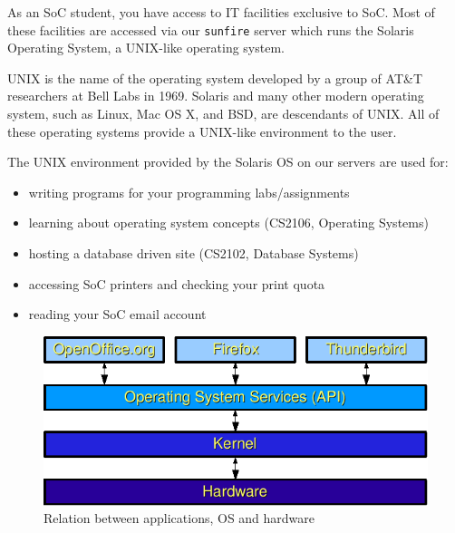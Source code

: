 
As an SoC student, you have access to IT facilities exclusive to SoC. Most of
these facilities are accessed via our \texttt{sunfire} server which runs the
Solaris Operating System, a UNIX-like operating system.  

UNIX is the name of the operating system developed by a group of AT\&T
researchers at Bell Labs in 1969.  Solaris and many other modern operating
system, such as Linux, Mac OS X, and BSD, are descendants of UNIX. All of these
operating systems provide a UNIX-like environment to the user. 

\begin{frame}
The UNIX environment provided by the Solaris OS on our servers are used for:
\begin{itemize}
\item writing programs for your programming labs/assignments
\item learning about operating system concepts (CS2106, Operating Systems)
\item hosting a database driven site (CS2102, Database Systems)
\item accessing SoC printers and checking your print quota
\item reading your SoC email account
\end{itemize}
\end{frame}

\begin{frame}
\begin{figure}
\begin{center}
\includegraphics[width=0.7\linewidth]{os-layers}
\end{center}
\caption{Relation between applications, OS and hardware}
\label{fig:os}
\end{figure}
\end{frame}

